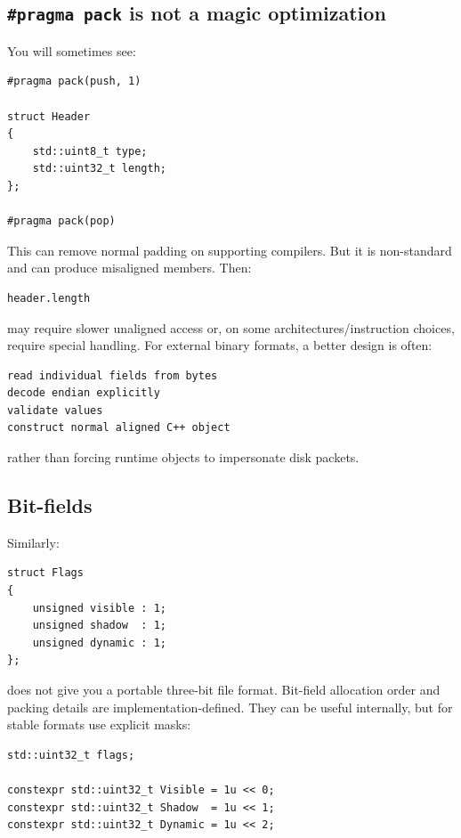 \subsection{\texorpdfstring{\texttt{\#pragma\ pack} is not a magic optimization}{\#pragma pack is not a magic optimization}}\label{05-engine-i-ch003-pragma-pack-is-not-a-magic-optimization}

You will sometimes see:

\begin{verbatim}
#pragma pack(push, 1)

struct Header
{
    std::uint8_t type;
    std::uint32_t length;
};

#pragma pack(pop)
\end{verbatim}

This can remove normal padding on supporting compilers. But it is non-standard and can produce misaligned members. Then:

\begin{verbatim}
header.length
\end{verbatim}

may require slower unaligned access or, on some architectures/instruction choices, require special handling. For external binary formats, a better design is often:

\begin{verbatim}
read individual fields from bytes
decode endian explicitly
validate values
construct normal aligned C++ object
\end{verbatim}

rather than forcing runtime objects to impersonate disk packets.

\subsection{Bit-fields}\label{05-engine-i-ch003-bit-fields}

Similarly:

\begin{verbatim}
struct Flags
{
    unsigned visible : 1;
    unsigned shadow  : 1;
    unsigned dynamic : 1;
};
\end{verbatim}

does not give you a portable three-bit file format. Bit-field allocation order and packing details are implementation-defined. They can be useful internally, but for stable formats use explicit masks:

\begin{verbatim}
std::uint32_t flags;

constexpr std::uint32_t Visible = 1u << 0;
constexpr std::uint32_t Shadow  = 1u << 1;
constexpr std::uint32_t Dynamic = 1u << 2;
\end{verbatim}

